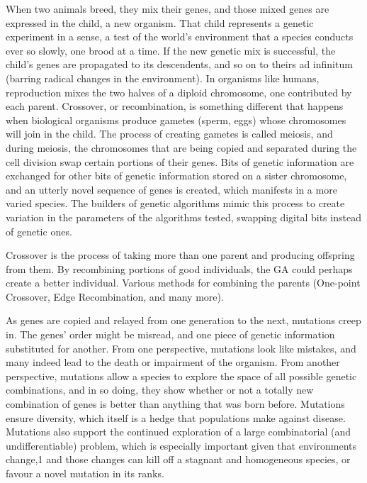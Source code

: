 When two animals breed, they mix their genes, and those mixed genes are expressed in the child, a new organism. That child represents a genetic experiment in a sense, a test of the world’s environment that a species conducts ever so slowly, one brood at a time. If the new genetic mix is successful, the child’s genes are propagated to its descendents, and so on to theirs ad infinitum (barring radical changes in the environment). In organisms like humans, reproduction mixes the two halves of a diploid chromosome, one contributed by each parent. Crossover, or recombination, is something different that happens when biological organisms produce gametes (sperm, eggs) whose chromosomes will join in the child. The process of creating gametes is called meiosis, and during meiosis, the chromosomes that are being copied and separated during the cell division swap certain portions of their genes. Bits of genetic information are exchanged for other bits of genetic information stored on a sister chromosome, and an utterly novel sequence of genes is created, which manifests in a more varied species. The builders of genetic algorithms mimic this process to create variation in the parameters of the algorithms tested, swapping digital bits instead of genetic ones.

Crossover is the process of taking more than one parent and producing offspring from them.
By recombining portions of good individuals, the GA could perhaps create a better individual.
Various methods for combining the parents (One-point Crossover, Edge Recombination, and many more).


As genes are copied and relayed from one generation to the next, mutations creep in. The genes’ order might be misread, and one piece of genetic information substituted for another. From one perspective, mutations look like mistakes, and many indeed lead to the death or impairment of the organism. From another perspective, mutations allow a species to explore the space of all possible genetic combinations, and in so doing, they show whether or not a totally new combination of genes is better than anything that was born before. Mutations ensure diversity, which itself is a hedge that populations make against disease. Mutations also support the continued exploration of a large combinatorial (and undifferentiable) problem, which is especially important given that environments change,1 and those changes can kill off a stagnant and homogeneous species, or favour a novel mutation in its ranks.

